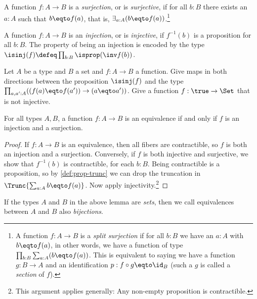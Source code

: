 \begin{definition}\label{def:surjection}
A function $f:A\to B$ is a \emph{surjection}, or is \emph{surjective},
if for all $b:B$ there exists an $a:A$ such that $b \eqto f(a)$,
that is, $\exists_{a:A} (b \eqto f(a))$.\footnote{%
  A function $f:A\to B$ is a \emph{split surjection}
  if for all $b:B$ we have an $a:A$ with $b \eqto f(a)$,
  in other words, we have a function of type
  $\prod_{b:B} \sum_{a:A} (b \eqto f(a))$.
  This is equivalent to saying we have a function
  $g:B\to A$ and an identification $p: f\circ g \eqto \id_B$
  (such a $g$ is called a \emph{section} of $f$).}
\end{definition}

\begin{definition}\label{def:injection}
  A function $f:A\to B$ is an \emph{injection}, or is \emph{injective},
  if $f^{-1}(b)$ is a proposition for all $b:B$.  The property of being an injection is encoded by
  the type $\isinj(f) \defeq \prod_{b:B} \isprop(\inv f (b))$.
\end{definition}

\begin{xca}\label{xca:inj-sets}
  Let $A$ be a type and $B$ a set and $f : A \to B$ a function. 
  Give maps in both directions between the proposition $\isinj(f)$
  and the type $\prod_{a,a':A}((f(a) \eqto f(a'))\to (a\eqto a'))$.
  Give a function $f:\true\to\Set$ that is not injective.
\end{xca}

\begin{lemma}\label{lem:inj+surj}
For all types $A,B$, a function $f: A\to B$ is an equivalence
if and only if $f$ is an injection and a surjection.
\end{lemma}

\begin{proof}
If $f: A\to B$ is an equivalence, then all fibers are contractible,
so $f$ is both an injection and a surjection. Conversely,
if $f$ is both injective and surjective, we show that
$f^{-1}(b)$ is contractible, for each $b:B$.
Being contractible is a proposition, so by \cref{def:prop-trunc}
we can drop the truncation in $\Trunc{\sum_{a:A} b \eqto f(a)}$.
Now apply injectivity.\footnote{%
  This argument applies generally:
  Any non-empty proposition is contractible.}
\end{proof}

If the types $A$ and $B$ in the above lemma are \emph{sets},
then we call equivalences between $A$ and $B$ also \emph{bijections}.

